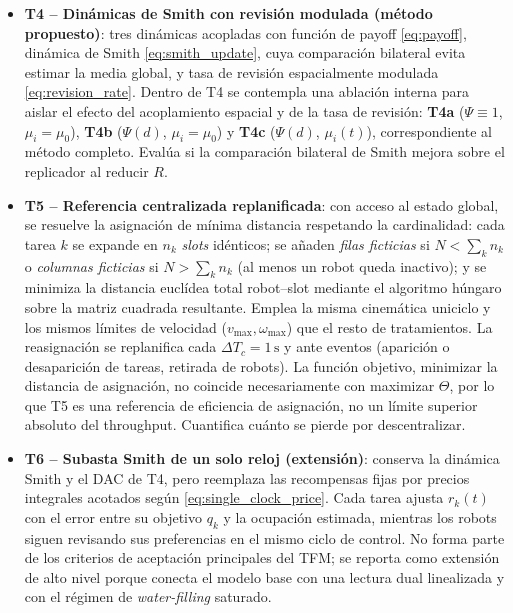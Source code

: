 \begin{itemize}
  \item \textbf{T4 -- Dinámicas de Smith con revisión modulada (método propuesto)}:
    tres dinámicas acopladas con función de payoff \eqref{eq:payoff}, dinámica de
    Smith \eqref{eq:smith_update}, cuya comparación bilateral evita estimar la
    media global, y tasa de revisión espacialmente modulada
    \eqref{eq:revision_rate}. Dentro de T4 se contempla una ablación interna para
    aislar el efecto del acoplamiento espacial y de la tasa de revisión:
    \textbf{T4a} ($\Psi\equiv1$, $\mu_i=\mu_0$), \textbf{T4b} ($\Psi(d)$,
    $\mu_i=\mu_0$) y \textbf{T4c} ($\Psi(d)$, $\mu_i(t)$), correspondiente al método
    completo. Evalúa si la comparación bilateral de Smith mejora sobre el replicador
    al reducir $R$.

  \item \textbf{T5 -- Referencia centralizada replanificada}: con acceso al
    estado global, se resuelve la asignación de mínima distancia respetando la
    cardinalidad: cada tarea $k$ se expande en $n_k$ \emph{slots} idénticos; se
    añaden \emph{filas ficticias} si $N < \sum_k n_k$ o \emph{columnas ficticias}
    si $N > \sum_k n_k$ (al menos un robot queda inactivo); y se minimiza la
    distancia euclídea total robot--slot mediante el algoritmo húngaro sobre la
    matriz cuadrada resultante. Emplea la misma cinemática uniciclo y los mismos
    límites de velocidad ($v_{\max},\omega_{\max}$) que el resto de tratamientos.
    La reasignación se replanifica cada $\Delta T_c = 1\,\text{s}$ y ante eventos
    (aparición o desaparición de tareas, retirada de robots). La función objetivo,
    minimizar la distancia de asignación, no coincide necesariamente con maximizar
    $\Theta$, por lo que T5 es una referencia de eficiencia de asignación, no un
    límite superior absoluto del throughput. Cuantifica cuánto se pierde por
    descentralizar.

  \item \textbf{T6 -- Subasta Smith de un solo reloj (extensión)}:
    conserva la dinámica Smith y el DAC de T4, pero reemplaza las recompensas fijas
    por precios integrales acotados según \eqref{eq:single_clock_price}. Cada tarea
    ajusta $r_k(t)$ con el error entre su objetivo $q_k$ y la ocupación estimada,
    mientras los robots siguen revisando sus preferencias en el mismo ciclo de
    control. No forma parte de los criterios de aceptación principales del TFM; se
    reporta como extensión de alto nivel porque conecta el modelo base con una
    lectura dual linealizada y con el régimen de \emph{water-filling} saturado.
\end{itemize}

